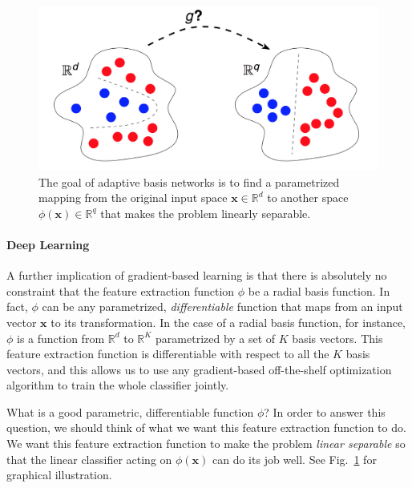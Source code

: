 \documentclass{report}
\newcommand{\vect}[1]{\mathbf{#1}}
\newcommand{\vx}[0]{\vect{x}}
\newcommand{\RR}[0]{\mathbb{R}}
\begin{document}
\begin{figure}
    \centering
    \begin{minipage}{0.6\textwidth}
        \centering
        \includegraphics[width=\columnwidth]{figures/adaptive_basis1.png}
    \end{minipage}
    \begin{minipage}{0.39\textwidth}
        \caption{
            \label{fig:feature_extraction}
            The goal of adaptive basis networks is to find a parametrized
            mapping from the original input space $\vx \in \mathbb{R}^d$ to
            another space $\phi(\vx) \in \mathbb{R}^q$ that makes the problem
            linearly separable. 
        }
    \end{minipage}
\end{figure}


\paragraph{Deep Learning}

A further implication of gradient-based learning is that there is absolutely no
constraint that the feature extraction function $\phi$ be a radial basis
function. In fact, $\phi$ can be any parametrized, {\it differentiable} function
that maps from an input vector $\vx$ to its transformation. In the case of a
radial basis function, for instance, $\phi$ is a function from $\RR^d$ to
$\RR^K$ parametrized by a set of $K$ basis vectors. This feature extraction
function is differentiable with respect to all the $K$ basis vectors, and this
allows us to use any gradient-based off-the-shelf optimization algorithm to
train the whole classifier jointly.

What is a good parametric, differentiable function $\phi$? In order to answer
this question, we should think of what we want this feature extraction function
to do. We want this feature extraction function to make the problem {\it linear
separable} so that the linear classifier acting on $\phi(\vx)$ can do its job
well. See Fig.~\ref{fig:feature_extraction} for graphical illustration. 
\end{document}
